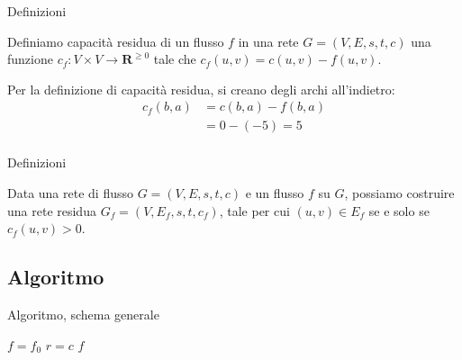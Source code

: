 \begin{frame}{Definizioni}

\vspace{-9pt}
\begin{myboxtitle}
Definiamo \alert{capacità residua} di un flusso $f$ in una rete $G=(V,E,s,t,c)$ 
una funzione $c_f: V \times V \rightarrow \mathbf{R}^{\geq 0}$
tale che $c_f(u,v) = c(u,v) - f(u,v)$.
\end{myboxtitle}

\smallskip
\begin{center}
\end{center}

Per la definizione di capacità residua, si creano degli archi all'indietro:
\begin{align*}
  c_f(b,a) &= c(b,a) - f(b,a) \\
           &= 0 - (-5)  = 5 \\
\end{align*}

\end{frame}

\begin{frame}{Definizioni}

\vspace{-9pt}
\begin{myboxtitle}
Data una rete di flusso $G=(V,E,s,t,c)$ e un flusso $f$ su $G$, 
possiamo costruire una \alert{rete residua} $G_f=(V,E_f,s,t,c_f)$, tale
per cui $(u,v) \in E_f$ se e solo se $c_f(u,v) > 0$. 
\end{myboxtitle}

\smallskip
\begin{center}
\end{center}

\end{frame}

\subsection{Algoritmo}

\begin{frame}{Algoritmo, schema generale}

\begin{Procedure}
\caption[A]{$\INTARRAY[\,]$ \Flusso(\Graph $G$, \Node $s$, \Node $t$, $\INTARRAY[\,]\ c$)}
$f = f_0$
$r = c$
\Return $f$
\end{Procedure}

\end{frame}

